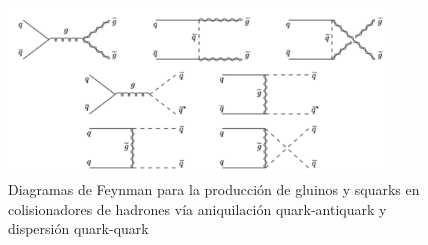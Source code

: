 \begin{figure}[h]
  \centering \includegraphics[width=0.9\textwidth]{figures/figure_103}
  \caption{Diagramas de Feynman para la producción de gluinos y squarks en
    colisionadores de hadrones vía aniquilación quark-antiquark y dispersión
    quark-quark}
  \label{fig:strongprod2}
\end{figure}


